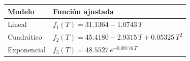 \begin{tabular}{l l}
\toprule
Modelo & Función ajustada \\
\midrule
Lineal & $f_1(T)=\num{31.1364} - \num{1.0743}\,T$ \\
Cuadrático & $f_2(T)=\num{45.4180} - \num{2.9315}\,T + \num{0.05325}\,T^2$ \\
Exponencial & $f_3(T)=\num{48.5527}\,e^{\num{-0.08776}\,T}$ \\
\bottomrule
\end{tabular}
